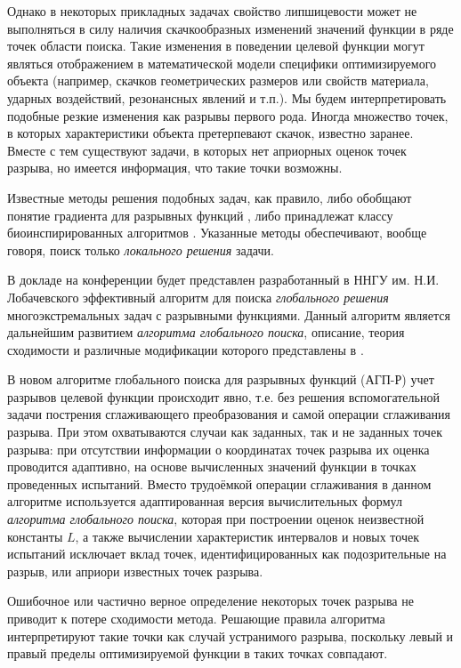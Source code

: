 \documentclass[11pt, oneside, a4paper]{article}
\begin{document}
Однако в некоторых прикладных задачах свойство липшицевости может не выполняться в силу наличия скачкообразных изменений значений функции в ряде точек области поиска. Такие изменения в поведении целевой функции могут являться отображением в математической модели специфики оптимизируемого объекта (например, скачков геометрических размеров или свойств материала, ударных воздействий, резонансных явлений и т.п.). Мы будем интерпретировать подобные резкие изменения как разрывы первого рода. Иногда множество точек, в которых характеристики объекта претерпевают скачок, известно заранее. Вместе с тем существуют задачи, в которых нет априорных оценок точек разрыва, но имеется информация, что такие точки возможны.

Известные методы решения подобных задач, как правило, либо обобщают понятие градиента для разрывных функций \cite{Batuhtin1997}, либо принадлежат классу биоинспирированных алгоритмов \cite{Jihui}. Указанные методы обеспечивают, вообще говоря, поиск только \textit{локального решения} задачи. 

В докладе на конференции будет представлен разработанный в ННГУ им. Н.И. Лобачевского эффективный алгоритм для поиска \textit{глобального решения} многоэкстремальных задач с разрывными функциями. 
Данный алгоритм является дальнейшим развитием \textit{алгоритма глобального поиска}, описание, теория сходимости и различные модификации которого представлены в \cite{Strongin2013}. 

В новом алгоритме глобального поиска для разрывных функций (АГП-Р) учет разрывов целевой функции происходит явно, т.е. без решения вспомогательной задачи пострения  сглаживающего преобразования и самой операции сглаживания разрыва. При этом охватываются случаи как заданных, так и не заданных точек разрыва: при отсутствии информации о координатах точек разрыва их оценка проводится адаптивно, на основе вычисленных значений функции в точках проведенных испытаний.
Вместо трудоёмкой операции сглаживания в данном алгоритме используется адаптированная версия вычислительных формул \textit{алгоритма глобального поиска}, которая при построении оценок неизвестной константы $L$, а также вычислении характеристик интервалов и новых точек испытаний исключает вклад точек, идентифицированных как подозрительные на разрыв, или априори известных точек разрыва.

Ошибочное или частично верное определение некоторых точек разрыва не приводит к потере сходимости метода. Решающие правила алгоритма интерпретируют такие точки как случай устранимого разрыва, поскольку левый и правый пределы оптимизируемой функции в таких точках совпадают.
\end{document}
